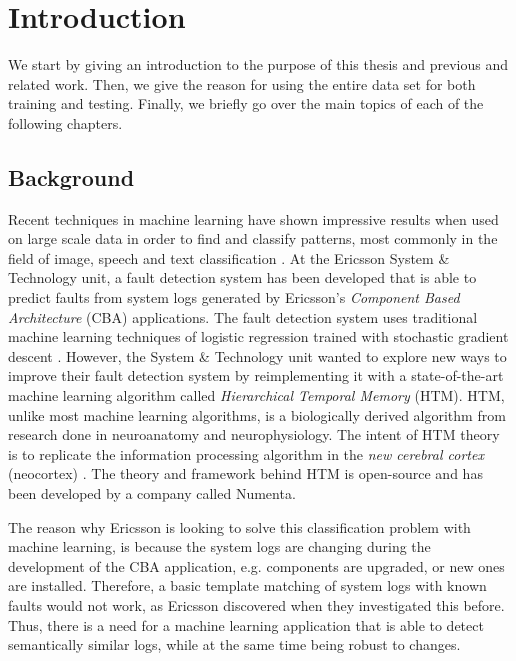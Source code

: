\chapter{Introduction}
We start by giving an introduction to the purpose of this thesis and previous and related work. Then, we give the reason for using the entire data set for both training and testing. Finally, we briefly go over the main topics of each of the following chapters.


\section{Background}
Recent techniques in machine learning have shown impressive results when used on large scale data in order to find and classify patterns, most commonly in the field of image, speech and text classification \cite{image,speech,text}. At the Ericsson System \& Technology unit, a fault detection system has been developed that is able to predict faults from system logs generated by Ericsson's \textit{Component Based Architecture} (CBA) applications. The fault detection system uses traditional machine learning techniques of logistic regression trained with stochastic gradient descent \cite{linnaeus}. However, the System \& Technology unit wanted to explore new ways to improve their fault detection system by reimplementing it with a state-of-the-art machine learning algorithm called \textit{Hierarchical Temporal Memory} (HTM). HTM, unlike most machine learning algorithms, is a biologically derived algorithm from research done in neuroanatomy and neurophysiology. The intent of HTM theory is to replicate the information processing algorithm in the \textit{new cerebral cortex} (neocortex) \cite{bami}. The theory and framework behind HTM is open-source and has been developed by a company called Numenta.


The reason why Ericsson is looking to solve this classification problem with machine learning, is because the system logs are changing during the development of the CBA application, e.g. components are upgraded, or new ones are installed. Therefore, a basic template matching of system logs with known faults would not work, as Ericsson discovered when they investigated this before. Thus, there is a need for a machine learning application that is able to detect semantically similar logs, while at the same time being robust to changes. 


